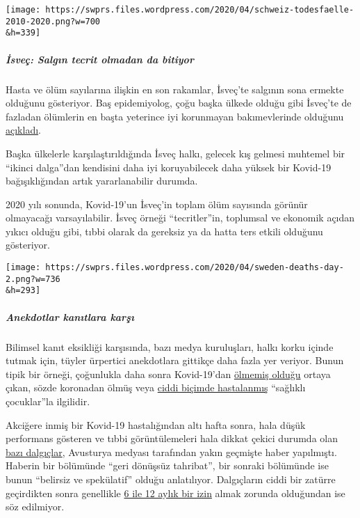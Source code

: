 \texttt{[image: https://swprs.files.wordpress.com/2020/04/schweiz-todesfaelle-2010-2020.png?w=700\\\&h=339]}

\hypertarget{isveuxe7-salgux131n-tecrit-olmadan-da-bitiyor}{%
\subparagraph{\texorpdfstring{\textbf{İsveç: Salgın tecrit olmadan da
bitiyor}}{İsveç: Salgın tecrit olmadan da bitiyor}}\label{isveuxe7-salgux131n-tecrit-olmadan-da-bitiyor}}

Hasta ve ölüm sayılarına ilişkin en son rakamlar, İsveç'te salgının sona
ermekte olduğunu gösteriyor. Baş epidemiyolog, çoğu başka ülkede olduğu
gibi İsveç'te de fazladan ölümlerin en başta yeterince iyi korunmayan
bakımevlerinde olduğunu
\href{https://www.washingtontimes.com/news/2020/apr/15/sweden-coronavirus-rates-easing-despite-loose-rule/}{açıkladı}.

Başka ülkelerle karşılaştırıldığında İsveç halkı, gelecek kış gelmesi
muhtemel bir ``ikinci dalga''dan kendisini daha iyi koruyabilecek daha
yüksek bir Kovid-19 bağışıklığından artık yararlanabilir durumda.

2020 yılı sonunda, Kovid-19'un İsveç'in toplam ölüm sayısında görünür
olmayacağı varsayılabilir. İsveç örneği ``tecritler''in, toplumsal ve
ekonomik açıdan yıkıcı olduğu gibi, tıbbi olarak da gereksiz ya da hatta
ters etkili olduğunu gösteriyor.

\texttt{[image: https://swprs.files.wordpress.com/2020/04/sweden-deaths-day-2.png?w=736\\\&h=293]}

\hypertarget{anekdotlar-kanux131tlara-karux15fux131}{%
\subparagraph{\texorpdfstring{\textbf{Anekdotlar kanıtlara
karşı}}{Anekdotlar kanıtlara karşı}}\label{anekdotlar-kanux131tlara-karux15fux131}}

Bilimsel kanıt eksikliği karşısında, bazı medya kuruluşları, halkı korku
içinde tutmak için, tüyler ürpertici anekdotlara gittikçe daha fazla yer
veriyor. Bunun tipik bir örneği, çoğunlukla daha sonra Kovid-19'dan
\href{https://www.dailymail.co.uk/news/article-8193487/Coroner-refuses-rule-COVID-19-cause-death-six-week-old-Connecticut-baby.html}{ölmemiş
olduğu} ortaya çıkan, sözde koronadan ölmüş veya
\href{https://sports.yahoo.com/spanish-football-coach-francisco-garcia-163153573.html}{ciddi
biçimde hastalanmış} ``sağlıklı çocuklar''la ilgilidir.

Akciğere inmiş bir Kovid-19 hastalığından altı hafta sonra, hala düşük
performans gösteren ve tıbbi görüntülemeleri hala dikkat çekici durumda
olan
\href{https://www.rainews.it/tgr/tagesschau/articoli/2020/04/tag-Coronavirus-Lungeschaden-Forschung-Uniklinik-Innsbruck-6708e11e-28dc-4843-a760-e7f926ace61c.html}{bazı
dalgıçlar}, Avusturya medyası tarafından yakın geçmişte haber
yapılmıştı. Haberin bir bölümünde ``geri dönüşsüz tahribat'', bir
sonraki bölümünde ise bunun ``belirsiz ve spekülatif'' olduğu
anlatılıyor. Dalgıçların ciddi bir zatürre geçirdikten sonra genellikle
\href{https://www.deeperblue.com/pulmonary-considerations-in-diving/}{6
ile 12 aylık bir izin} almak zorunda olduğundan ise söz edilmiyor.

